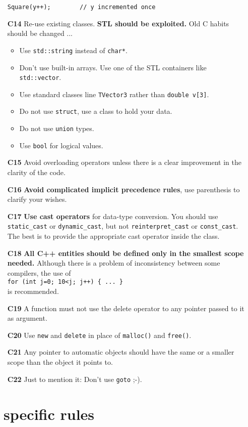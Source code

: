 \begin{itemize}
\begin{verbatim}
Square(y++);        // y incremented once
  \end{verbatim}
\item[\bf C14] Re-use existing classes. {\bf STL should be exploited.} Old
  C habits should be changed ...
  \begin{itemize}
    \item Use {\tt std::string} instead of {\tt char*}.
    \item Don't use built-in arrays. Use one of the STL containers like 
          {\tt std::vector}.
    \item Use standard classes line {\tt TVector3} rather than {\tt double v[3]}.
    \item Do not use {\tt struct}, use a class to hold your data.
    \item Do not use {\tt union} types.
    \item Use {\tt bool} for logical values.
  \end{itemize}
\item[\bf C15] Avoid overloading operators unless there is a clear improvement
  in the clarity of the code.
\item[\bf C16] {\bf Avoid complicated implicit precedence rules}, use parenthesis
  to clarify your wishes.
\item[\bf C17] {\bf Use cast operators} for data-type conversion. You should use
  {\tt static\_cast} or {\tt dynamic\_cast}, but not {\tt reinterpret\_cast} or
  {\tt const\_cast}. The best is to provide the appropriate cast operator inside
  the class.
\item[\bf C18] {\bf All C++ entities should be defined only in the smallest
    scope needed.} Although there is a problem of inconsistency between some
  compilers, the use of\\
  {\tt for (int j=0; 10<j; j++) \{ ... \}}\\
  is recommended.
\item[\bf C19] A function must not use the delete operator to any pointer
  passed to it as argument. 
\item[\bf C20] Use {\tt new} and {\tt delete} in place of {\tt malloc()} and
  {\tt free()}.
\item[\bf C21] Any pointer to automatic objects should have the same or a
  smaller scope than the object it points to.
\item[\bf C22] Just to mention it: Don't use {\tt goto} ;-).
\end{itemize}

\section{\rs\ specific rules}

